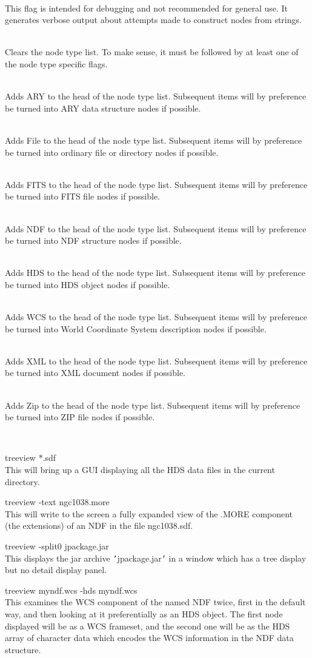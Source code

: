 \documentclass[twoside,11pt]{article}
\renewcommand{\_}{\texttt{\symbol{95}}}
\newcommand{\sstexamples}[1]{
   \item[Examples:] \mbox{} \\
   \vspace{-3.5ex}
   \begin{description}
      #1
   \end{description}
}
\newcommand{\sstsubsection}[1]{ \item[{#1}] \mbox{} \\}
\newcommand{\sstexamplesubsection}[2]{\sloppy \item{\ssttt #1} \mbox{} \\ #2 }
\newcommand{\sstexamples}[1]{
      \item[Examples:] \\
      \begin{description}
         #1
      \end{description}
      \\
   }
\newcommand{\sstsubsection}[1]{\item[{#1}]}
\newcommand{\sstexamplesubsection}[2]{\item[{\ssttt #1}] #2}
\begin{document}
{{{      }
      \sstsubsection{
         -debug
      }{
         This flag is intended for debugging and not recommended for
         general use.  It generates verbose output about attempts made
         to construct nodes from strings.
      }
      \sstsubsection{
         -strict
      }{
         Clears the node type list.  To make sense, it must be followed
         by at least one of the node type specific flags.
      }
      \sstsubsection{
         -ary
      }{
         Adds ARY to the head of the node type list.
         Subsequent items will by preference be turned into
         ARY data structure nodes if possible.
      }
      \sstsubsection{
         -file
      }{
         Adds File to the head of the node type list.
         Subsequent items will by preference be turned into
         ordinary file or directory nodes if possible.
      }
      \sstsubsection{
         -fit
      }{
         Adds FITS to the head of the node type list.
         Subsequent items will by preference be turned into
         FITS file nodes if possible.
      }
      \sstsubsection{
         -ndf
      }{
         Adds NDF to the head of the node type list.
         Subsequent items will by preference be turned into
         NDF structure nodes if possible.
      }
      \sstsubsection{
         -hds
      }{
         Adds HDS to the head of the node type list.
         Subsequent items will by preference be turned into
         HDS object nodes if possible.
      }
      \sstsubsection{
         -wcs
      }{
         Adds WCS to the head of the node type list.
         Subsequent items will by preference be turned into
         World Coordinate System description nodes if possible.
      }
      \sstsubsection{
         -xml
      }{
         Adds XML to the head of the node type list.
         Subsequent items will by preference be turned into
         XML document nodes if possible.
      }
      \sstsubsection{
         -zip
      }{
         Adds Zip to the head of the node type list.
         Subsequent items will by preference be turned into
         ZIP file nodes if possible.
      }
   }
   \sstexamples{
      \sstexamplesubsection{
         treeview $*$.sdf
      }{
         This will bring up a GUI displaying all the HDS data files in
         the current directory.
      }
      \sstexamplesubsection{
         treeview -text ngc1038.more
      }{
         This will write to the screen a fully expanded view of the
         .MORE component (the extensions) of an NDF in the file
         ngc1038.sdf.
      }
      \sstexamplesubsection{
         treeview -split0 jpackage.jar
      }{
         This displays the jar archive {\tt '}jpackage.jar{\tt '} in a window which
         has a tree display but no detail display panel.
      }
      \sstexamplesubsection{
         treeview myndf.wcs -hds myndf.wcs
      }{
         This examines the WCS component of the named NDF twice, first
         in the default way, and then looking at it preferentially as
         an HDS object.  The first node displayed will be as a WCS
         frameset, and the second one will be as the HDS array of
         character data which encodes the WCS information in the NDF
         data structure.
      }
   }
}
\end{document}
